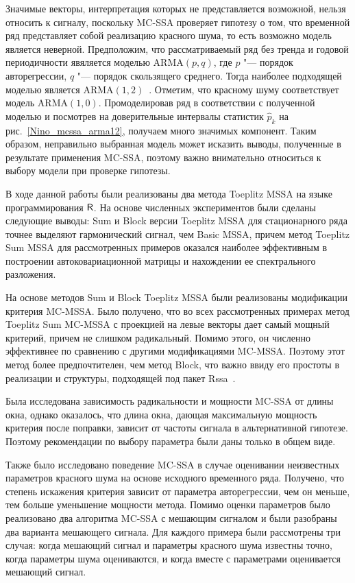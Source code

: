 \documentclass[specialist,
substylefile = spbu_report.rtx,
subf,href,colorlinks=true, 12pt]{disser}
\theoremstyle{definition}
\begin{document}
Значимые векторы, интерпретация которых не представляется возможной, нельзя относить к сигналу, поскольку MC-SSA проверяет гипотезу о том, что временной ряд представляет собой реализацию красного шума, то есть возможно модель является неверной. Предположим, что рассматриваемый ряд без тренда и годовой периодичности явяляется моделью ARMA$(p, q)$, где $p$ "--- порядок авторегрессии, $q$ "--- порядок скользящего среднего. Тогда наиболее подходящей моделью является ARMA$(1, 2)$~\cite{auto.arima}. Отметим, что красному шуму соответствует модель ARMA$(1, 0)$. Промоделировав ряд в соответствии с полученной моделью и посмотрев на доверительные интервалы статистик $\hat p_k$ на рис.~\ref{Nino_mcssa_arma12}, получаем много значимых компонент. Таким образом, неправильно выбранная модель может исказить выводы, полученные в результате применения MC-SSA, поэтому важно внимательно относиться к выбору модели при проверке гипотезы.

\conclusion
В ходе данной работы были реализованы два метода Toeplitz MSSA на языке программирования $\mathsf{R}$. На основе численных экспериментов были сделаны следующие выводы: Sum и Block версии Toeplitz MSSA для стационарного ряда точнее выделяют гармонический сигнал, чем Basic MSSA, причем метод Toeplitz Sum MSSA для рассмотренных примеров оказался наиболее эффективным в построении автоковариационной матрицы и нахождении ее спектрального разложения.

На основе методов Sum и Block Toeplitz MSSA были реализованы модификации критерия MC-MSSA. Было получено, что во всех рассмотренных примерах метод Toeplitz Sum MC-MSSA с проекцией на левые векторы дает самый мощный критерий, причем не слишком радикальный. Помимо этого, он численно эффективнее по сравнению с другими модификациями MC-MSSA. Поэтому этот метод более предпочтителен, чем метод Block, что важно ввиду его простоты в реализации и структуры, подходящей под пакет Rssa~\cite{Rssa}.

Была исследована зависимость радикальности и мощности MC-SSA от длины окна, однако оказалось, что длина окна, дающая максимальную мощность критерия после поправки, зависит от частоты сигнала в альтернативной гипотезе. Поэтому рекомендации по выбору параметра были даны только в общем виде.

Также было исследовано поведение MC-SSA в случае оценивании неизвестных параметров красного шума на основе исходного временного ряда. Получено, что степень искажения критерия зависит от параметра авторегрессии, чем он меньше, тем больше уменьшение мощности метода. Помимо оценки параметров было реализовано два алгоритма MC-SSA с мешающим сигналом и были разобраны два варианта мешающего сигнала. Для каждого примера были рассмотрены три случая: когда мешающий сигнал и параметры красного шума известны точно, когда параметры шума оцениваются, и когда вместе с параметрами оценивается мешающий сигнал.
\end{document}
